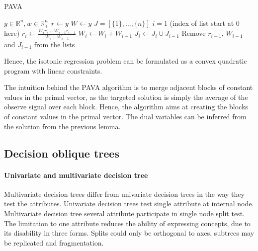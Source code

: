 \documentclass[12pt,preprint]{elsarticle}
\begin{document}
\begin{algorithm}[ht]
\caption{PAVA}\label{alg:cap}
\begin{algorithmic}
\Require $y \in\mathbb{R}^n, w \in \mathbb{R}^n_{+}$
\STATE $r \leftarrow y$
\STATE $W \leftarrow y$
\STATE $J = [\{1\},\dots, \{n\}]$ 
\STATE $i=1$ (index of list start at 0 here)
     
        \State $r_i \leftarrow \frac{W_i r_i + W_{i-1} r_{i-1}}{W_i + W_{i-1}}$
        \State $W_i \leftarrow W_i + W_{i-1}$
        \State $J_i \leftarrow J_i \cup J_{i-1}$
        \State Remove $r_{i-1}$, $W_{i-1}$ and $J_{i-1}$ from the lists
        \ENDIF
    \ELSE
    \ENDIF
\ENDWHILE
{}
\ENDFOR
{}
\end{algorithmic}
\end{algorithm}

Hence, the isotonic regression problem can be formulated as a convex quadratic program with linear constraints.

The intuition behind the PAVA algorithm is to merge adjacent blocks of constant values in the primal vector, as the targeted solution is simply the average of the observe signal over each block.
Hence, the algorithm aims at creating the blocks of constant values in the primal vector. The dual variables can be inferred from the  solution from the previous lemma.

\subsection{Decision oblique trees}

\paragraph{Univariate and multivariate decision tree}
Multivariate  decision  trees  differ  from  univariate  decision trees in the way they  test the  attributes.   Univariate decision trees  test  single  attribute  at  internal  node.  Multivariate decision tree several attribute participate in single node split test.    The  limitation  to  one  attribute  reduces the  ability  of expressing concepts, due to its disability in three forms.  Splits could only be orthogonal to axes, subtrees may be replicated and fragmentation. 
\end{document}
